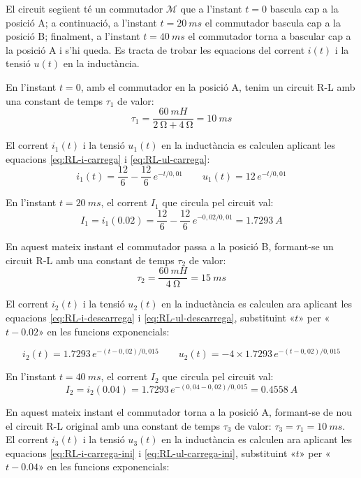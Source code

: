 \begin{exemple}\label{ex:CarDescRL}
	\addcontentsxms{\CarDescRL}	
    El circuit  següent té un commutador $\mathscr{M}$ que a l'instant $t=0$ bascula cap a la posició A; a continuació, a l'instant $t=\qty{20}{ms}$ el commutador bascula cap a la posició B; finalment, a  l'instant $t=\qty{40}{ms}$ el commutador torna a  bascular cap a la posició A i s'hi queda.     Es tracta de trobar les equacions del corrent $i(t)$ i la tensió $u(t)$ en la inductància.
    \vspace{-2mm}
   	\begin{center}
   	
   \end{center}
	 \vspace{-2mm}
    En l'instant $t=0$, amb el commutador en la posició A, tenim un circuit R-L amb una constant de temps $\tau_1$ de valor:
    \[
        \tau_1 = \frac{\qty{60}{mH}}{\qty{2}{\ohm}+\qty{4}{\ohm}} = \qty{10}{ms}
    \]

    El corrent $i_1(t)$ i la tensió $u_1(t)$ en la inductància es calculen aplicant les equacions \eqref{eq:RL-i-carrega} i \eqref{eq:RL-ul-carrega}:
    \[
        i_1(t) = \frac{12}{6} - \frac{12}{6}\,e^{-t/0,01} \qquad
        u_1(t) = 12\,e^{-t/0,01}
    \]

    En l'instant $t=\qty{20}{ms}$, el corrent $I_1$ que circula pel circuit val:
    \[
        I_1 = i_1(\num{0,02}) = \frac{12}{6} - \frac{12}{6}\,e^{-0,02/0,01} = \qty{1,7293}{A}
    \]

    En aquest mateix instant  el commutador passa a la posició B, formant-se un circuit R-L amb una constant de temps $\tau_2$ de valor:
    \[
        \tau_2 = \frac{\qty{60}{mH}}{\qty{4}{\ohm}} = \qty{15}{ms}
    \]

    El corrent $i_2(t)$ i la tensió $u_2(t)$ en la inductància es calculen ara aplicant les equacions \eqref{eq:RL-i-descarrega} i \eqref{eq:RL-ul-descarrega}, substituint «$t$» per «$t-\num{0,02}$» en les funcions exponencials:
    
    \[
        i_2(t) = \num{1,7293}\,e^{-(t-0,02)/0,015} \qquad
        u_2(t) = -4\times\num{1,7293}\,e^{-(t-0,02)/0,015}
    \]

    En l'instant $t=\qty{40}{ms}$, el corrent $I_2$ que circula pel circuit val:
    \[
        I_2 = i_2(\num{0,04}) = \num{1,7293}\,e^{-(0,04-0,02)/0,015} = \qty{0,4558}{A}
    \]

    En aquest mateix instant  el commutador torna a la posició A, formant-se de nou el circuit R-L original amb una constant de temps $\tau_3$ de valor: $\tau_3 = \tau_1 = \qty{10}{ms}$.     El corrent $i_3(t)$ i la tensió $u_3(t)$ en la inductància es calculen ara aplicant les equacions \eqref{eq:RL-i-carrega-ini} i \eqref{eq:RL-ul-carrega-ini}, substituint «$t$» per «$t-\num{0,04}$» en les funcions exponencials:


\end{exemple}
